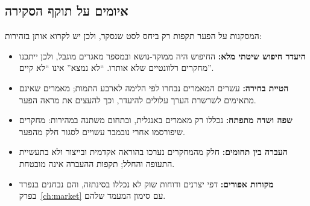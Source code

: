 \subsection*{איומים על תוקף הסקירה}
המסקנות על הפער תקפות רק ביחס לסט שנסקר, ולכן יש לקרוא אותן בזהירות:
\begin{itemize}
  \item \textbf{היעדר חיפוש שיטתי מלא:} החיפוש היה ממוקד-נושא ובמספר מאגרים מוגבל, ולכן ייתכנו מחקרים רלוונטיים שלא אותרו. “לא נמצא” אינו “לא קיים”.
  \item \textbf{הטיית בחירה:} עשרים המאמרים נבחרו לפי הלימה לארבע התמות; מאמרים שאינם מתאימים לשרשרת הערך עלולים להיעדר, וכך להעצים את מראה הפער.
  \item \textbf{שפה ושדה מתפתח:} נכללו רק מאמרים באנגלית, ובתחום משתנה במהירות: מחקרים שיפורסמו אחרי נובמבר  עשויים לסגור חלק מהפער.
  \item \textbf{העברה בין תחומים:} חלק מהמחקרים נערכו בהוראה אקדמית ובייצור ולא בתעשיית התעופה והחלל; תקפות ההעברה אינה מובטחת.
  \item \textbf{מקורות אפורים:} דפי יצרנים ודוחות שוק לא נכללו בסינתזה, והם נבחנים בנפרד בפרק~\ref{ch:market} עם סימון המעמד שלהם.
\end{itemize}

